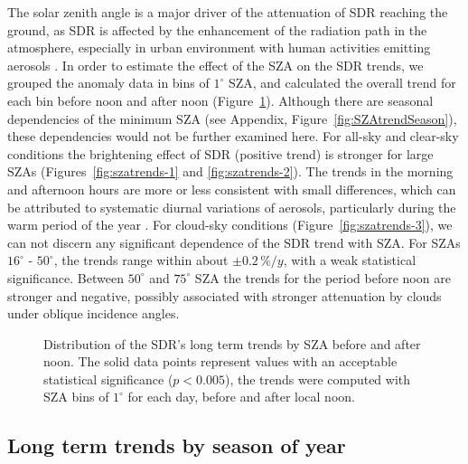\documentclass[An awesome
journal,,,moreauthors,pdftex]{Definitions/mdpi}
\begin{document}
The solar zenith angle is a major driver of the attenuation of SDR
reaching the ground, as SDR is affected by the enhancement of the
radiation path in the atmosphere, especially in urban environment with
human activities emitting aerosols \citep{Wang2021}. In order to
estimate the effect of the SZA on the SDR trends, we grouped the anomaly
data in bins of \(1^\circ\) SZA, and calculated the overall trend for
each bin before noon and after noon (Figure~\ref{fig:szatrends}).
Although there are seasonal dependencies of the minimum SZA (see
Appendix, Figure~\ref{fig:SZAtrendSeason}), these dependencies would not
be further examined here. For all-sky and clear-sky conditions the
brightening effect of SDR (positive trend) is stronger for large SZAs
(Figures~\ref{fig:szatrends-1} and \ref{fig:szatrends-2}). The trends in
the morning and afternoon hours are more or less consistent with small
differences, which can be attributed to systematic diurnal variations of
aerosols, particularly during the warm period of the year
\citep{Wang2021}. For cloud-sky conditions
(Figure~\ref{fig:szatrends-3}), we can not discern any significant
dependence of the SDR trend with SZA. For SZAs \(16^\circ\) -
\(50^\circ\), the trends range within about \(\pm 0.2\,\%/y\), with a
weak statistical significance. Between \(50^\circ\) and \(75^\circ\) SZA
the trends for the period before noon are stronger and negative,
possibly associated with stronger attenuation by clouds under oblique
incidence angles.

\begin{figure}[h!]

{\centering {}

}

\caption{Distribution of the SDR's long term trends by SZA before and after noon. The solid data points represent values with an acceptable statistical significance ($p<0.005$), the trends were computed with SZA bins of $1^\circ$ for each day, before and after local noon.}\label{fig:szatrends}
\end{figure}

\hypertarget{long-term-trends-by-season-of-year}{%
\subsection{Long term trends by season of
year}\label{long-term-trends-by-season-of-year}}
\end{document}
